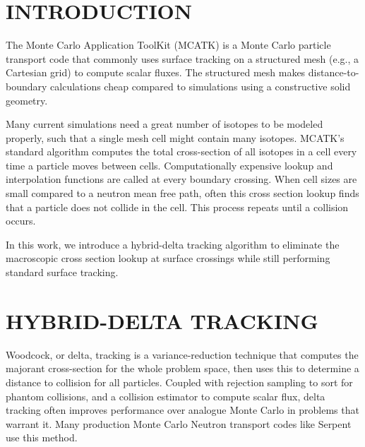 \section{INTRODUCTION} 
\label{sec:mcatkintro}

The Monte Carlo Application ToolKit (MCATK) \cite{mcatk} is a Monte Carlo particle transport code that commonly uses surface tracking on a structured mesh (e.g., a Cartesian grid) to compute scalar fluxes.
The structured mesh makes distance-to-boundary calculations cheap compared to simulations using a constructive solid geometry.

Many current simulations need a great number of isotopes to be modeled properly, such that a single mesh cell might contain many isotopes. 
MCATK's standard algorithm computes the total cross-section of all isotopes in a cell every time a particle moves between cells.
Computationally expensive lookup and interpolation functions are called at every boundary crossing.
When cell sizes are small compared to a neutron mean free path, often this cross section lookup finds that a particle does not collide in the cell.
This process repeats until a collision occurs.

In this work, we introduce a hybrid-delta tracking algorithm to eliminate the macroscopic cross section lookup at surface crossings while still performing standard surface tracking.

\section{HYBRID-DELTA TRACKING}
\label{sec:mcatkmethod}

Woodcock, or delta, tracking \cite{woodcock_techniques_1965} is a variance-reduction technique that computes the majorant cross-section for the whole problem space, then uses this to determine a distance to collision for all particles.
Coupled with rejection sampling to sort for phantom collisions, and a collision estimator to compute scalar flux, delta tracking often improves performance over analogue Monte Carlo in problems that warrant it.
Many production Monte Carlo Neutron transport codes like Serpent \cite{leppanen_development_2013} use this method.

